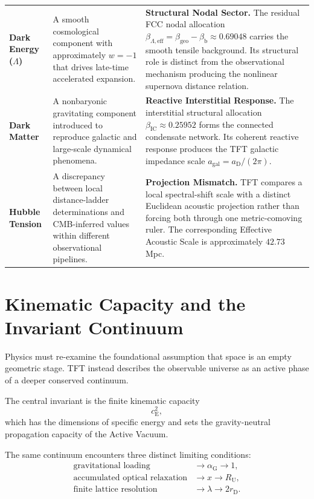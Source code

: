 \begin{longtable}{@{} p{3.0cm} p{5.5cm} p{6.5cm} @{}}
\textbf{Dark Energy ($\Lambda$)} & A smooth cosmological component with approximately $w=-1$ that drives late-time accelerated expansion. & \textbf{Structural Nodal Sector.} The residual FCC nodal allocation $\beta_{\Lambda,\mathrm{eff}} = \beta_{\mathrm{geo}}-\beta_{\mathrm b} \approx 0.69048$ carries the smooth tensile background. Its structural role is distinct from the observational mechanism producing the nonlinear supernova distance relation. \\

\textbf{Dark Matter} & A nonbaryonic gravitating component introduced to reproduce galactic and large-scale dynamical phenomena. & \textbf{Reactive Interstitial Response.} The interstitial structural allocation $\beta_{\mathrm{IC}} \approx 0.25952$ forms the connected condensate network. Its coherent reactive response produces the TFT galactic impedance scale $a_{\mathrm{gal}}=a_{\mathrm D}/(2\pi)$. \\

\textbf{Hubble Tension} & A discrepancy between local distance-ladder determinations and CMB-inferred values within different observational pipelines. & \textbf{Projection Mismatch.} TFT compares a local spectral-shift scale with a distinct Euclidean acoustic projection rather than forcing both through one metric-comoving ruler. The corresponding Effective Acoustic Scale is approximately $42.73$ Mpc. \\

\end{longtable}
\egroup


\section{Kinematic Capacity and the Invariant Continuum}

Physics must re-examine the foundational assumption that space is an empty geometric stage. TFT instead describes the observable universe as an active phase of a deeper conserved continuum.

The central invariant is the finite kinematic capacity
\begin{equation}
    c_{\mathrm E}^2,
\end{equation}
which has the dimensions of specific energy and sets the gravity-neutral propagation capacity of the Active Vacuum.

The same continuum encounters three distinct limiting conditions:
\begin{equation}
\begin{aligned}
    \text{gravitational loading}
    &\longrightarrow
    \alpha_{\mathrm G}\rightarrow1,
    \\
    \text{accumulated optical relaxation}
    &\longrightarrow
    x\rightarrow R_{\mathrm U},
    \\
    \text{finite lattice resolution}
    &\longrightarrow
    \lambda\rightarrow2r_{\mathrm D}.
\end{aligned}
\end{equation}

